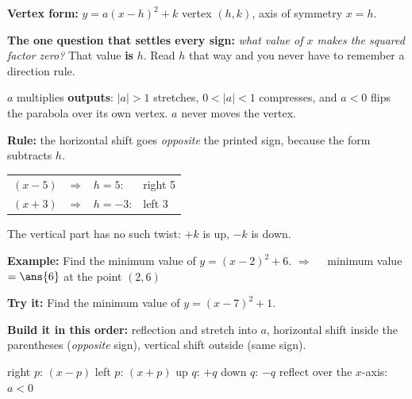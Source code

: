 \documentclass[12pt]{article}
\begin{document}

\begin{formulabox}
\textbf{Vertex form:} \quad $y = a(x - h)^2 + k$ \quad vertex $(h, k)$, axis of symmetry $x = h$.\par
\textbf{The one question that settles every sign:} \emph{what value of $x$ makes the
squared factor zero?} That value \textbf{is} $h$. Read $h$ that way and you never have to
remember a direction rule.\par
$a$ multiplies \textbf{outputs}: $|a| > 1$ stretches, $0 < |a| < 1$ compresses, and $a < 0$
flips the parabola over its own vertex. $a$ never moves the vertex.
\end{formulabox}


\begin{formulabox}
\textbf{Rule:} the horizontal shift goes \emph{opposite} the printed sign, because the form
subtracts $h$.\par
\begin{tabular}{@{}ll@{}}
$(x - 5)$ \ $\Rightarrow$ \ $h = 5$: & right 5\\
$(x + 3)$ \ $\Rightarrow$ \ $h = -3$: & left 3\\
\end{tabular}\par
The vertical part has no such twist: $+k$ is up, $-k$ is down.
\end{formulabox}

\begin{examplebox}
\textbf{Example:} \quad Find the minimum value of $y = (x - 2)^2 + 6$.
$\Rightarrow\quad$ minimum value $= \ans{6}$ at the point $(2, 6)$
\end{examplebox}

\begin{tryitbox}
\textbf{Try it:} \quad Find the minimum value of $y = (x - 7)^2 + 1$.\\[2pt]
\end{tryitbox}


\begin{formulabox}
\textbf{Build it in this order:} reflection and stretch into $a$, horizontal shift inside
the parentheses (\emph{opposite} sign), vertical shift outside (same sign).\par
right $p$: $(x - p)$ \quad left $p$: $(x + p)$ \quad up $q$: $+q$ \quad down $q$: $-q$
\quad reflect over the $x$-axis: $a < 0$
\end{formulabox}
\end{document}

